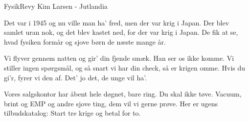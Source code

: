 {FysikRevy}
{Kim Larsen - Jutlandia}
{
Det var i 1945 og
nu ville man ha' fred,
men der var krig i Japan.
Der blev samlet uran nok,
og det blev kastet ned,
for der var krig i Japan.
De fik at se, hvad fysiken formår
og sjove børn de næste mange år.


Vi flyver gennem natten
og gir' din fjende smæk.
Han ser os ikke komme.
Vi stiller ingen spørgsmål,
og så snart vi har din check,
så er krigen omme.
Hvis du gi'r, fyrer vi den af.
Det' jo det, de unge vil ha'.


Vores salgskontor har åbent hele døgnet,
bare ring. 
Du skal ikke tøve.
Vacuum, brint og EMP
og andre sjove ting,
dem vil vi gerne prøve.
Her er ugens tilbudskatalog:
Start tre krige og betal for to.




%


}